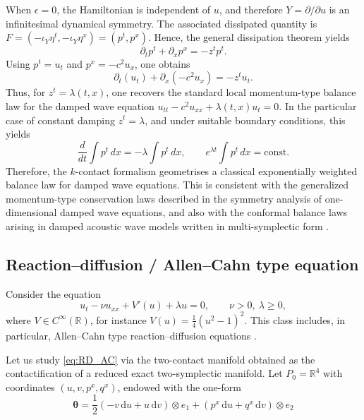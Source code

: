 \documentclass[11pt,a4paper]{article}
\newcommand{\dd}{\mathrm{d}}
\theoremstyle{plain} \newtheorem{theorem}{Theorem}[section] \newtheorem{proposition}[theorem]{Proposition} \newtheorem{corollary}[theorem]{Corollary} \newtheorem{lemma}[theorem]{Lemma} \theoremstyle{definition} \newtheorem{definition}[theorem]{Definition} \theoremstyle{remark} \newtheorem{remark}[theorem]{Remark} \newtheorem{example}[theorem]{Example} %
\begin{document}
When \(\epsilon=0\), the Hamiltonian is independent of \(u\), and therefore \(Y=\partial/\partial u\) is an infinitesimal dynamical symmetry. The associated dissipated quantity is \(F=(-\iota_Y\eta^t,-\iota_Y\eta^x)=(p^t,p^x)\). Hence, the general dissipation theorem yields
\[
\partial_t p^t+\partial_x p^x=-z^t p^t.
\]
Using \(p^t=u_t\) and \(p^x=-c^2u_x\), one obtains
\[
\partial_t(u_t)+\partial_x(-c^2u_x)=-z^t u_t.
\]
Thus, for \(z^t=\lambda(t,x)\), one recovers the standard local momentum-type balance law for the damped wave equation \(u_{tt}-c^2u_{xx}+\lambda(t,x)u_t=0\). In the particular case of constant damping \(z^t=\lambda\), and under suitable boundary conditions, this yields
\[
\frac{d}{dt}\int p^t\,dx=-\lambda\int p^t\,dx,
\qquad
e^{\lambda t}\int p^t\,dx=\mathrm{const}.
\]
Therefore, the \(k\)-contact formalism geometrises a classical exponentially weighted balance law for damped wave equations. This is consistent with the generalized momentum-type conservation laws described in the symmetry analysis of one-dimensional damped wave equations, and also with the conformal balance laws arising in damped acoustic wave models written in multi-symplectic form \cite{CaiZhangWang2017}.
\subsection{Reaction--diffusion / Allen--Cahn type equation}
\label{subsec:allencahn}

Consider the equation
\begin{equation}\label{eq:RD_AC}
u_t-\nu u_{xx}+V'(u)+\lambda u=0,\qquad \nu>0,\ \lambda\ge0,
\end{equation}
where \(V\in C^\infty(\mathbb R)\), for instance \(V(u)=\frac14(u^2-1)^2\). This class includes, in particular, Allen--Cahn type reaction--diffusion equations \cite{AllenCahn1979,Murray2002,Fife1979}.

Let us study \eqref{eq:RD_AC} via the two-contact manifold obtained as the contactification of a reduced exact two-symplectic manifold. Let \(P_0=\mathbb R^4\) with coordinates \((u,v,p^x,q^x)\), endowed with the one-form 
\[\bm\theta=\frac12(-v\,\dd u+u\,\dd v)\otimes e_1+(p^x\,\dd u+q^x\,\dd v)\otimes e_2\]
\end{document}
